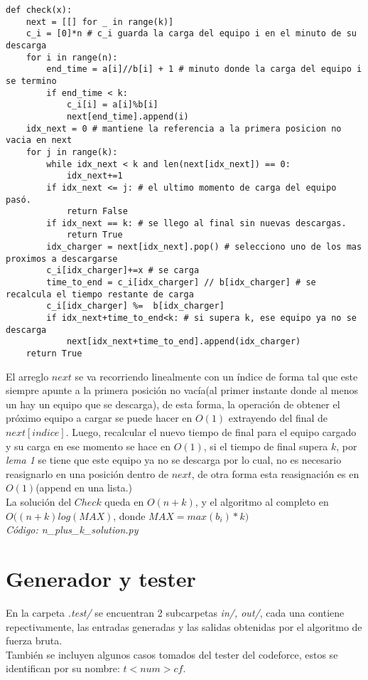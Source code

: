 \documentclass{article}
\begin{document}
\begin{verbatim}
def check(x):
    next = [[] for _ in range(k)] 
    c_i = [0]*n # c_i guarda la carga del equipo i en el minuto de su descarga
    for i in range(n):
        end_time = a[i]//b[i] + 1 # minuto donde la carga del equipo i se termino
        if end_time < k:
            c_i[i] = a[i]%b[i]
            next[end_time].append(i)
    idx_next = 0 # mantiene la referencia a la primera posicion no vacia en next
    for j in range(k):
        while idx_next < k and len(next[idx_next]) == 0:
            idx_next+=1
        if idx_next <= j: # el ultimo momento de carga del equipo pasó.
            return False
        if idx_next == k: # se llego al final sin nuevas descargas.
            return True
        idx_charger = next[idx_next].pop() # selecciono uno de los mas proximos a descargarse
        c_i[idx_charger]+=x # se carga
        time_to_end = c_i[idx_charger] // b[idx_charger] # se recalcula el tiempo restante de carga
        c_i[idx_charger] %=  b[idx_charger]
        if idx_next+time_to_end<k: # si supera k, ese equipo ya no se descarga
            next[idx_next+time_to_end].append(idx_charger)
    return True
\end{verbatim}


El arreglo $next$ se va recorriendo linealmente con un \'indice de forma tal que este siempre apunte a la primera posici\'on no vac\'ia(al primer instante donde al menos un hay un equipo que se descarga), de esta forma, la operaci\'on de obtener el pr\'oximo equipo a cargar se puede hacer en $O(1)$ extrayendo del final de $next[indice]$. Luego, recalcular el nuevo tiempo de final para el equipo cargado y su carga en ese momento se hace en $O(1)$, si el tiempo de final supera $k$, por \textit{lema 1} se tiene que este equipo ya no se descarga por lo cual, no es necesario reasignarlo en una posici\'on dentro de $next$, de otra forma esta reasignaci\'on es en $O(1)$(append en una lista.)\\
La soluci\'on del $Check$ queda en $O(n+k)$, y el algoritmo al completo en $O((n+k)log(MAX)$, donde $MAX=max(b_i)*k)$\\
\textit{C\'odigo: n\_plus\_k\_solution.py}\\


\section{Generador y tester}

En la carpeta \textit{.test/} se encuentran 2 subcarpetas \textit{in/, out/}, cada una contiene repectivamente, las entradas generadas y las salidas obtenidas por el algoritmo de fuerza bruta.\\
Tambi\'en se incluyen algunos casos tomados del tester del codeforce, estos se identifican por su nombre: \textit{$t<num>cf$}.\\
\end{document}
